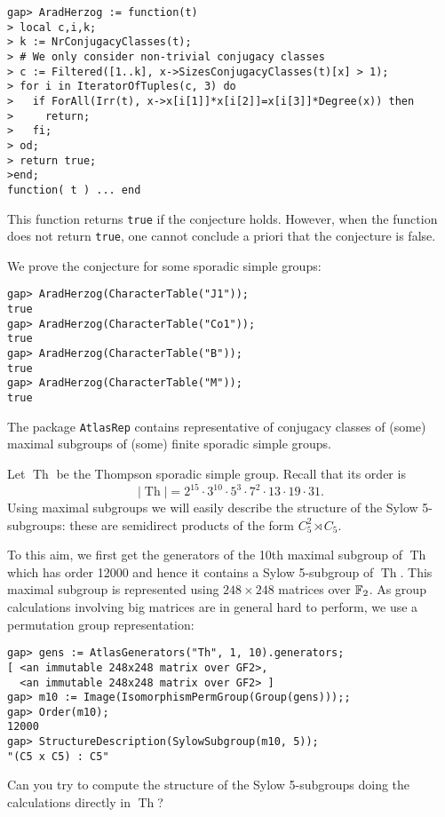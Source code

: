 \begin{example}
\begin{lstlisting}
gap> AradHerzog := function(t)
> local c,i,k;
> k := NrConjugacyClasses(t);
> # We only consider non-trivial conjugacy classes
> c := Filtered([1..k], x->SizesConjugacyClasses(t)[x] > 1);
> for i in IteratorOfTuples(c, 3) do
>   if ForAll(Irr(t), x->x[i[1]]*x[i[2]]=x[i[3]]*Degree(x)) then
>     return;
>   fi;
> od;
> return true;
>end;
function( t ) ... end
\end{lstlisting}
This function returns \lstinline{true} if the conjecture holds. 
However, when the function does not return \lstinline{true}, 
one cannot conclude a priori that the conjecture is false. 

We prove the conjecture for some sporadic simple groups:
\begin{lstlisting}
gap> AradHerzog(CharacterTable("J1"));
true
gap> AradHerzog(CharacterTable("Co1"));
true
gap> AradHerzog(CharacterTable("B"));
true
gap> AradHerzog(CharacterTable("M"));
true
\end{lstlisting}
\end{example}

The package \lstinline{AtlasRep} contains representative
of conjugacy classes of (some) maximal subgroups of (some)
finite sporadic simple groups. 

\begin{example}
    Let $\operatorname{Th}$ be the Thompson sporadic simple group. 
    Recall that its order is 
    \[
    |\operatorname{Th}|= 2^{15}\cdot 3^{10}\cdot 5^3\cdot 7^2\cdot 13\cdot 19\cdot 31.
    \]
    Using maximal subgroups 
    we will easily describe 
    the structure of the Sylow 5-subgroups: 
    these are semidirect products  
    of the form $C_5^2\rtimes C_5$. 
    
    To this aim, we first get the
    generators of the 10th maximal subgroup of $\operatorname{Th}$
    which has order 12000 and hence it contains
    a Sylow 5-subgroup of $\operatorname{Th}$. 
    This maximal subgroup is represented using 
    $248\times248$ matrices over $\mathbb{F}_2$. As
    group calculations
    involving big matrices are in general hard to perform, 
    we use 
    a permutation group representation: 
\begin{lstlisting}
gap> gens := AtlasGenerators("Th", 1, 10).generators;
[ <an immutable 248x248 matrix over GF2>,
  <an immutable 248x248 matrix over GF2> ]
gap> m10 := Image(IsomorphismPermGroup(Group(gens)));;
gap> Order(m10);
12000
gap> StructureDescription(SylowSubgroup(m10, 5));
"(C5 x C5) : C5"
\end{lstlisting}
Can you try to compute the structure of the Sylow 5-subgroups
doing the calculations directly in $\operatorname{Th}$?
\end{example}



